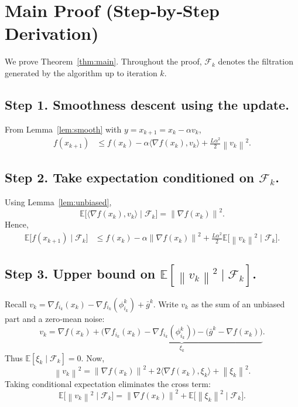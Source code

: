 \documentclass{article}
\newcommand{\EE}{\mathbb{E}}
\newcommand{\norm}[1]{\left\|#1\right\|}
\newcommand{\inner}[2]{\langle #1,#2\rangle}
\begin{document}
\section*{Main Proof (Step‑by‑Step Derivation)}
We prove Theorem~\ref{thm:main}.  Throughout the proof,
$\mathcal{F}_k$ denotes the filtration generated by the algorithm up to
iteration $k$.

\subsection*{Step 1. Smoothness descent using the update.}
From Lemma~\ref{lem:smooth} with $y=x_{k+1}=x_k-\alpha v_k$,
\begin{align}
f(x_{k+1})
 &\le f(x_k)-\alpha\inner{\nabla f(x_k)}{v_k}
      +\frac{L\alpha^{2}}{2}\norm{v_k}^{2}.
 \tag{6}
\end{align}

\subsection*{Step 2. Take expectation conditioned on $\mathcal{F}_k$.}
Using Lemma~\ref{lem:unbiased},
\[
\EE\!\bigl[\inner{\nabla f(x_k)}{v_k}\mid\mathcal{F}_k\bigr]
   =\norm{\nabla f(x_k)}^{2}.
\]
Hence,
\begin{align}
\EE\!\bigl[f(x_{k+1})\mid\mathcal{F}_k\bigr]
 &\le f(x_k)-\alpha\norm{\nabla f(x_k)}^{2}
    +\frac{L\alpha^{2}}{2}
      \EE\!\bigl[\norm{v_k}^{2}\mid\mathcal{F}_k\bigr].
 \tag{7}
\end{align}

\subsection*{Step 3. Upper bound on $\EE[\norm{v_k}^{2}\mid\mathcal{F}_k]$.}
Recall $v_k = \nabla f_{i_k}(x_k)-\nabla f_{i_k}(\phi_{i_k}^{k})+\bar g^{k}$.
Write $v_k$ as the sum of an unbiased part and a zero‑mean noise:
\[
v_k = \nabla f(x_k) + \underbrace{
      \bigl(\nabla f_{i_k}(x_k)-\nabla f_{i_k}(\phi_{i_k}^{k})\bigr)
      -\bigl(\bar g^{k}-\nabla f(x_k)\bigr)}_{\displaystyle \xi_k}.
\]
Thus $\EE[\xi_k\mid\mathcal{F}_k]=0$.
Now,
\[
\norm{v_k}^{2}= \norm{\nabla f(x_k)}^{2}
    +2\inner{\nabla f(x_k)}{\xi_k}
    +\norm{\xi_k}^{2}.
\]
Taking conditional expectation eliminates the cross term:
\[
\EE\!\bigl[\norm{v_k}^{2}\mid\mathcal{F}_k\bigr]
   =\norm{\nabla f(x_k)}^{2}
     +\EE\!\bigl[\norm{\xi_k}^{2}\mid\mathcal{F}_k\bigr].
\tag{8}
\]
\end{document}
